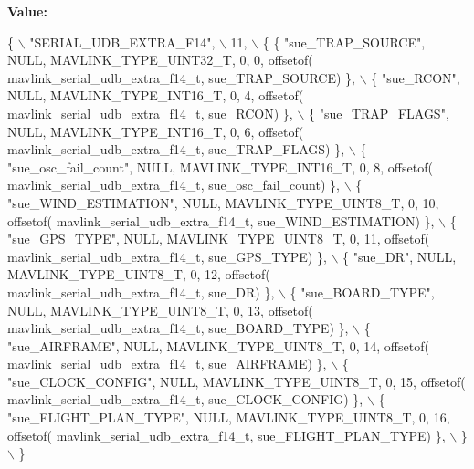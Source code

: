 {\bfseries Value\+:}
\begin{DoxyCode}
\{ \(\backslash\)
    \textcolor{stringliteral}{"SERIAL\_UDB\_EXTRA\_F14"}, \(\backslash\)
    11, \(\backslash\)
    \{  \{ \textcolor{stringliteral}{"sue\_TRAP\_SOURCE"}, NULL, MAVLINK_TYPE_UINT32_T, 0, 0, offsetof(
      mavlink_serial_udb_extra_f14_t, sue\_TRAP\_SOURCE) \}, \(\backslash\)
         \{ \textcolor{stringliteral}{"sue\_RCON"}, NULL, MAVLINK_TYPE_INT16_T, 0, 4, offsetof(
      mavlink_serial_udb_extra_f14_t, sue\_RCON) \}, \(\backslash\)
         \{ \textcolor{stringliteral}{"sue\_TRAP\_FLAGS"}, NULL, MAVLINK_TYPE_INT16_T, 0, 6, offsetof(
      mavlink_serial_udb_extra_f14_t, sue\_TRAP\_FLAGS) \}, \(\backslash\)
         \{ \textcolor{stringliteral}{"sue\_osc\_fail\_count"}, NULL, MAVLINK_TYPE_INT16_T, 0, 8, offsetof(
      mavlink_serial_udb_extra_f14_t, sue\_osc\_fail\_count) \}, \(\backslash\)
         \{ \textcolor{stringliteral}{"sue\_WIND\_ESTIMATION"}, NULL, MAVLINK_TYPE_UINT8_T, 0, 10, offsetof(
      mavlink_serial_udb_extra_f14_t, sue\_WIND\_ESTIMATION) \}, \(\backslash\)
         \{ \textcolor{stringliteral}{"sue\_GPS\_TYPE"}, NULL, MAVLINK_TYPE_UINT8_T, 0, 11, offsetof(
      mavlink_serial_udb_extra_f14_t, sue\_GPS\_TYPE) \}, \(\backslash\)
         \{ \textcolor{stringliteral}{"sue\_DR"}, NULL, MAVLINK_TYPE_UINT8_T, 0, 12, offsetof(
      mavlink_serial_udb_extra_f14_t, sue\_DR) \}, \(\backslash\)
         \{ \textcolor{stringliteral}{"sue\_BOARD\_TYPE"}, NULL, MAVLINK_TYPE_UINT8_T, 0, 13, offsetof(
      mavlink_serial_udb_extra_f14_t, sue\_BOARD\_TYPE) \}, \(\backslash\)
         \{ \textcolor{stringliteral}{"sue\_AIRFRAME"}, NULL, MAVLINK_TYPE_UINT8_T, 0, 14, offsetof(
      mavlink_serial_udb_extra_f14_t, sue\_AIRFRAME) \}, \(\backslash\)
         \{ \textcolor{stringliteral}{"sue\_CLOCK\_CONFIG"}, NULL, MAVLINK_TYPE_UINT8_T, 0, 15, offsetof(
      mavlink_serial_udb_extra_f14_t, sue\_CLOCK\_CONFIG) \}, \(\backslash\)
         \{ \textcolor{stringliteral}{"sue\_FLIGHT\_PLAN\_TYPE"}, NULL, MAVLINK_TYPE_UINT8_T, 0, 16, offsetof(
      mavlink_serial_udb_extra_f14_t, sue\_FLIGHT\_PLAN\_TYPE) \}, \(\backslash\)
         \} \(\backslash\)
\}
\end{DoxyCode}
\mbox{\label{mavlink__msg__serial__udb__extra__f14_8h_a0d679a72a6afe6cf62192b89b935801a}} 
